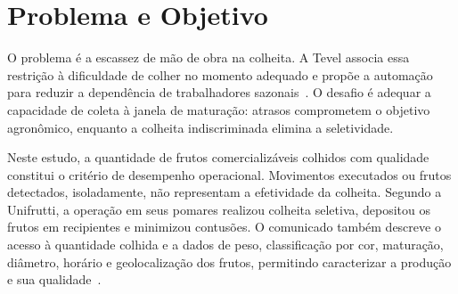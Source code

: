 \section{Problema e Objetivo}

O problema é a escassez de mão de obra na colheita. A Tevel associa essa restrição à dificuldade de colher no momento adequado e propõe a automação para reduzir a dependência de trabalhadores sazonais~\cite{tevel2026,unifrutti2023tevel}. O desafio é adequar a capacidade de coleta à janela de maturação: atrasos comprometem o objetivo agronômico, enquanto a colheita indiscriminada elimina a seletividade.

Neste estudo, a quantidade de frutos comercializáveis colhidos com qualidade constitui o critério de desempenho operacional. Movimentos executados ou frutos detectados, isoladamente, não representam a efetividade da colheita. Segundo a Unifrutti, a operação em seus pomares realizou colheita seletiva, depositou os frutos em recipientes e minimizou contusões. O comunicado também descreve o acesso à quantidade colhida e a dados de peso, classificação por cor, maturação, diâmetro, horário e geolocalização dos frutos, permitindo caracterizar a produção e sua qualidade~\cite{unifrutti2023tevel}.